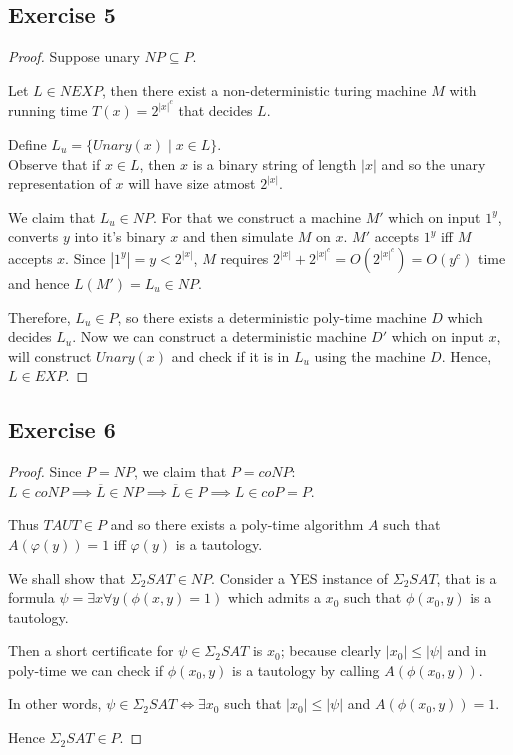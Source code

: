 \documentclass[12pt]{article}
\begin{document}
\subsection*{Exercise 5}
\begin{proof}
Suppose unary $NP \subseteq P$.

Let $L \in NEXP$, then there exist a non-deterministic turing machine $M$ with running time $T(x) = 2^{|x|^c}$ that decides $L$. 

Define $L_u = \{Unary(x) \mid x \in L\}$.\\

Observe that if $x \in L$, then $x$ is a binary string of length $|x|$ and so the unary representation of $x$ will have size atmost $2^{|x|}$.

We claim that $L_u \in NP$. For that we construct a machine $M'$ which on input $1^y$, converts $y$ into it's binary $x$ and then simulate $M$ on $x$. $M'$ accepts $1^y$ iff $M$ accepts $x$. Since $|1^y| = y < 2^{|x|}$, $M$ requires $2^{|x|} + 2^{|x|^c} = O(2^{|x|^c}) = O(y^c)$ time and hence $L(M') = L_u \in NP$.

Therefore, $L_u \in P$, so there exists a deterministic poly-time machine $D$ which decides $L_u$. Now we can construct a deterministic machine $D'$ which on input $x$, will construct $Unary(x)$ and check if it is in $L_u$ using the machine $D$. Hence, $L \in EXP$.
\end{proof}

\subsection*{Exercise 6}
\begin{proof}
Since $P=NP$, we claim that $P = coNP$: $L \in coNP \implies \overline{L} \in NP \implies \overline{L} \in P \implies L \in coP = P$.

Thus $TAUT \in P$ and so there exists a poly-time algorithm $A$ such that $A(\varphi(y)) = 1$ iff $\varphi(y)$ is a tautology.

We shall show that $\Sigma_2 SAT \in NP$. Consider a YES instance of $\Sigma_2 SAT$, that is a formula $\psi = \exists x \forall y (\phi(x,y) = 1)$ which admits a $x_0$ such that $\phi(x_0,y)$ is a tautology.

Then a short certificate for $\psi \in \Sigma_2 SAT$ is $x_0$; because clearly $|x_0| \leq |\psi|$ and in poly-time we can check if $\phi(x_0,y)$ is a tautology by calling $A(\phi(x_0, y))$.

In other words, $\psi \in \Sigma_2 SAT \iff \exists x_0$ such that $|x_0| \leq |\psi|$ and $A(\phi(x_0,y))=1$.

Hence $\Sigma_2 SAT \in P$.
\end{proof}

\vspace{2in} %
\end{document}
